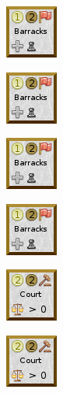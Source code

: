\documentclass{article}
\begin{document}
\begin{figure}
  \begin{subfigure}{}
    \includegraphics[scale=1]{../rules/png/doe_building_barracks.png}
  \end{subfigure}
  \begin{subfigure}{}
    \includegraphics[scale=1]{../rules/png/doe_building_barracks.png}
  \end{subfigure}
  \begin{subfigure}{}
    \includegraphics[scale=1]{../rules/png/doe_building_barracks.png}
  \end{subfigure}
  \begin{subfigure}{}
    \includegraphics[scale=1]{../rules/png/doe_building_barracks.png}
  \end{subfigure}
  \begin{subfigure}{}
    \includegraphics[scale=1]{../rules/png/doe_building_court.png}
  \end{subfigure}
  \begin{subfigure}{}
    \includegraphics[scale=1]{../rules/png/doe_building_court.png}
  \end{subfigure}
  \begin{subfigure}{}

\end{subfigure}
\end{figure}
\end{document}
